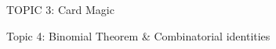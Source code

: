 \documentclass[handout]{mcs}
\begin{document}
\renewcommand{\reading}{
{Chapter~\bref{inc-ex_sec}{--\bref{cardmagic_sec}{, Inclusion-exclusion,
Pigeon Hole Principle, and Combinatorial Proof}}}}





\begin{staffnotes}
TOPIC 3: Card Magic
\end{staffnotes}

\begin{staffnotes}
Topic 4: Binomial Theorem \& Combinatorial identities
\end{staffnotes}


\end{document}
